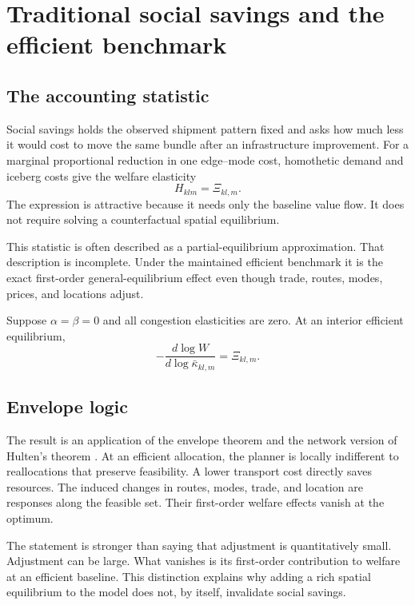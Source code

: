 \chapter{Traditional social savings and the efficient benchmark}
\label{ch:hulten}

\section{The accounting statistic}

Social savings holds the observed shipment pattern fixed and asks how much
less it would cost to move the same bundle after an infrastructure
improvement. For a marginal proportional reduction in one edge--mode cost,
homothetic demand and iceberg costs give the welfare elasticity
\[
 H_{klm}=\Xi_{kl,m}.
\]
The expression is attractive because it needs only the baseline value flow.
It does not require solving a counterfactual spatial equilibrium.

This statistic is often described as a partial-equilibrium approximation.
That description is incomplete. Under the maintained efficient benchmark it
is the exact first-order general-equilibrium effect even though trade, routes,
modes, prices, and locations adjust.

\begin{proposition}
\label{prop:hulten}
Suppose \(\alpha=\beta=0\) and all congestion elasticities are zero. At an
interior efficient equilibrium,
\[
 -\frac{d\log W}{d\log\bar\kappa_{kl,m}}=\Xi_{kl,m}.
\]
\end{proposition}

\section{Envelope logic}

The result is an application of the envelope theorem and the network version
of Hulten's theorem \citep{hulten1978growth,baqaee2019macroeconomic}. At an
efficient allocation, the planner is locally indifferent to reallocations
that preserve feasibility. A lower transport cost directly saves resources.
The induced changes in routes, modes, trade, and location are responses along
the feasible set. Their first-order welfare effects vanish at the optimum.

The statement is stronger than saying that adjustment is quantitatively
small. Adjustment can be large. What vanishes is its first-order contribution
to welfare at an efficient baseline. This distinction explains why adding a
rich spatial equilibrium to the model does not, by itself, invalidate social
savings.

